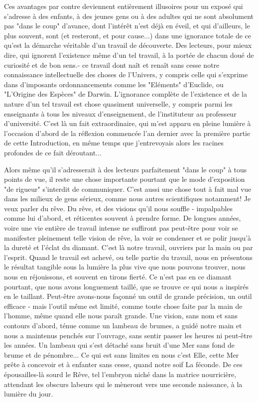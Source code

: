 Ces avantages par contre deviennent entièrement illusoires pour un exposé qui s'adresse à des enfants, à des jeunes gens ou à des adultes qui ne sont absolument pas "dans le coup" d'avance, dont l'intérêt n'est déjà en éveil, et qui d'ailleurs, le plus souvent, sont (et resteront, et pour cause...) dans une ignorance totale de ce qu'est la démarche véritable d'un travail de découverte. Des lecteurs, pour mieux dire, qui ignorent l'existence même d'un tel travail, à la portée de chacun doué de curiosité et de bon sens.- ce travail dont naît et renaît sans cesse notre connaissance intellectuelle des choses de l'Univers, y compris celle qui s'exprime dans d'imposants ordonnancements comme les "Eléments" d'Euclide, ou "L'Origine des Espèces" de Darwin. L'ignorance complète de l'existence et de la nature d'un tel travail est chose quasiment universelle, y compris parmi les enseignants à tous les niveaux d'enseignement, de l'instituteur au professeur d'université. C'est là un fait extraordinaire, qui m'est apparu en pleine lumière à l'occasion d'abord de la réflexion commencée l'an dernier avec la première partie de cette Introduction, en même temps que j'entrevoyais alors les racines profondes de ce fait déroutant...

Alors même qu'il s'adresserait à des lecteurs parfaitement "dans le coup" à tous points de vue, il reste une chose importante pourtant que le mode d'exposition "de rigueur" s'interdit de communiquer. C'est aussi une chose tout à fait mal vue dans les milieux de gens sérieux, comme nous autres scientifiques notamment! Je veux parler du rêve. Du rêve, et des visions qu'il nous souffle - impalpables comme lui d'abord, et réticentes souvent à prendre forme. De longues années, voire une vie entière de travail intense ne suffiront pas peut-être pour voir se manifester pleinement telle vision de rêve, la voir se condenser et se polir jusqu'à la dureté et l'éclat du diamant. C'est là notre travail, ouvriers par la main ou par l'esprit. Quand le travail est achevé, ou telle partie du travail, nous en présentons le résultat tangible sous la lumière la plus vive que nous pouvons trouver, nous nous en réjouissons, et souvent en tirons fierté. Ce n'est pas en ce diamant pourtant, que nous avons longuement taillé, que se trouve ce qui nous a inspirés en le taillant. Peut-être avons-nous façonné un outil de grande précision, un outil efficace - mais l'outil même est limité, comme toute chose faite par la main de l'homme, même quand elle nous paraît grande. Une vision, sans nom et sans contours d'abord, ténue comme un lambeau de brumes, a guidé notre main et nous a maintenus penchés sur l'ouvrage, sans sentir passer les heures ni peut-être les années. Un lambeau qui s'est détaché sans bruit d'une Mer sans fond de brume et de pénombre... Ce qui est sans limites en nous c'est Elle, cette Mer prête à concevoir et à enfanter sans cesse, quand notre soif La féconde. De ces épousailles-là sourd le Rêve, tel l'embryon niché dans la matrice nourricière, attendant les obscurs labeurs qui le mèneront vers une seconde naissance, à la lumière du jour.

